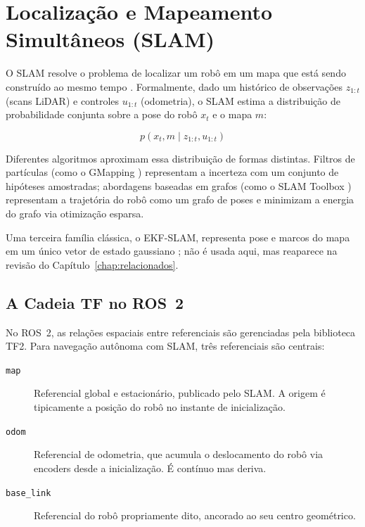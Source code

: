 \section{Localização e Mapeamento Simultâneos (SLAM)}
\label{sec:slam}

O SLAM resolve o problema de localizar um robô em um mapa que está sendo construído
ao mesmo tempo \cite{durrantwhyte2006, thrun2005}. Formalmente, dado um histórico de
observações $z_{1:t}$ (scans LiDAR) e controles $u_{1:t}$ (odometria), o SLAM
estima a distribuição de probabilidade conjunta sobre a pose do robô $x_t$ e o mapa
$m$:

\begin{equation}
p(x_t, m \mid z_{1:t}, u_{1:t})
\label{eq:slam_probabilistico}
\end{equation}

Diferentes algoritmos aproximam essa distribuição de formas distintas. Filtros de
partículas (como o GMapping \cite{grisetti2007}) representam a incerteza com um
conjunto de hipóteses amostradas; abordagens baseadas em grafos (como o SLAM Toolbox
\cite{macenski2021slam}) representam a trajetória do robô como um grafo de poses
e minimizam a energia do grafo via otimização esparsa.

Uma terceira família clássica, o EKF-SLAM, representa pose e marcos do mapa
em um único vetor de estado gaussiano \cite{thrun2005}; não é usada aqui, mas
reaparece na revisão do Capítulo~\ref{chap:relacionados}.

\subsection{A Cadeia TF no ROS~2}
\label{sec:cadeia_tf}

No ROS~2, as relações espaciais entre referenciais são gerenciadas pela biblioteca
TF2. Para navegação autônoma com SLAM, três referenciais são centrais:

\begin{description}
    \item[\texttt{map}] Referencial global e estacionário, publicado pelo SLAM.
    A origem é tipicamente a posição do robô no instante de inicialização.

    \item[\texttt{odom}] Referencial de odometria, que acumula o deslocamento
    do robô via encoders desde a inicialização. É contínuo mas deriva.

    \item[\texttt{base\_\allowbreak link}] Referencial do robô propriamente dito,
    ancorado ao seu centro geométrico.
\end{description}

